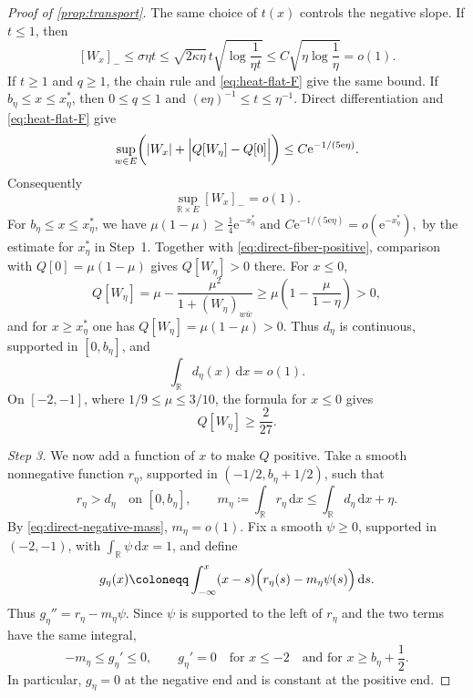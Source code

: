 \documentclass[11pt,a4paper]{article}
\begin{document}
\begin{proof}[Proof of \cref{prop:transport}]
		The same choice of $t(x)$ controls the negative slope.  If $t\le1$,
		then
		\[
			[W_x]_-\le\sigma\eta t
			\le\sqrt{2\kappa\eta}\,
			t\sqrt{\log\frac1{\eta t}}
			\le C\sqrt{\eta\log\frac1\eta}=o(1).
		\]
		If $t\ge1$ and $q\ge1$, the chain rule and
		\eqref{eq:heat-flat-F} give the same bound.  If
		$b_\eta\le x\le x_\eta^*$, then $0\le q\le1$ and
		$(\mathrm{e}\eta)^{-1}\le t\le\eta^{-1}$.  Direct differentiation
		and \eqref{eq:heat-flat-F} give
		\[
			\sup_{w\in E}\biggl(
			|W_x|+\Bigl|Q[W_\eta]-Q[0]\Bigr|
			\biggr)
			\le C\mathrm{e}^{-1/(5\mathrm{e}\eta)}.
		\]
		Consequently
		\begin{equation}\label{eq:direct-negative-slope}
			\sup_{\mathbb R\times E}[W_x]_-
			=o(1).
		\end{equation}
		For $b_\eta\le x\le x_\eta^*$, we have
		\(
			\mu(1-\mu)\ge\frac14\mathrm{e}^{-x_\eta^*}
			\text{ and }
			C\mathrm{e}^{-1/(5\mathrm{e}\eta)}
			=o(\mathrm{e}^{-x_\eta^*}),
		\)
		by the estimate for $x_\eta^*$ in Step~1.  Together with
		\eqref{eq:direct-fiber-positive}, comparison with
		$Q[0]=\mu(1-\mu)$ gives $Q[W_\eta]>0$ there.  For $x\le0$,
		\[
			Q[W_\eta]
			=\mu-\frac{\mu^2}{1+(W_\eta)_{w\bar w}}
			\ge\mu\left(1-\frac{\mu}{1-\eta}\right)>0,
		\]
		and for $x\ge x_\eta^*$ one has
		$Q[W_\eta]=\mu(1-\mu)>0$.  Thus $d_\eta$ is continuous,
		supported in $[0,b_\eta]$, and
		\begin{equation}\label{eq:direct-negative-mass}
			\int_{\mathbb R}d_\eta(x)\,\mathrm{d}x
			=o(1).
		\end{equation}
		On $[-2,-1]$, where
		$1/9\le\mu\le3/10$, the formula for $x\le0$ gives
		\[
			Q[W_\eta]\ge\frac2{27}.
		\]

		\emph{Step 3.}
		We now add a function of $x$ to make $Q$ positive.
		Take a smooth nonnegative function $r_\eta$, supported in
		$(-1/2,b_\eta+1/2)$, such that
		\[
			r_\eta>d_\eta\quad\text{on }[0,b_\eta],
			\qquad
			m_\eta\coloneqq\int_{\mathbb R}r_\eta\,\mathrm{d}x
			\le\int_{\mathbb R}d_\eta\,\mathrm{d}x+\eta.
		\]
		By \eqref{eq:direct-negative-mass}, $m_\eta=o(1)$.
		Fix a smooth $\psi\ge0$, supported in $(-2,-1)$, with
		$\int_{\mathbb R}\psi\,\mathrm{d}x=1$, and define
		\[
			g_\eta(x)\coloneqq
			\int_{-\infty}^x(x-s)
			\Bigl(r_\eta(s)-m_\eta\psi(s)\Bigr)\,\mathrm{d}s.
		\]
		Thus $g_\eta''=r_\eta-m_\eta\psi$.  Since $\psi$ is supported to
		the left of $r_\eta$ and the two terms have the same integral,
		\[
			-m_\eta\le g_\eta'\le0,\qquad
			g_\eta'=0\quad\text{for }x\le-2
			\quad\text{and for }x\ge b_\eta+\frac12.
		\]
		In particular, $g_\eta=0$ at the negative end and is constant at
		the positive end.


\end{proof}
\end{document}

